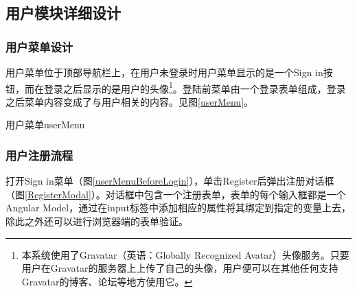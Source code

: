 \subsection{用户模块详细设计}
\subsubsection{用户菜单设计}
用户菜单位于顶部导航栏上，在用户未登录时用户菜单显示的是一个Sign in按钮，而在登录之后显示的是用户的头像\footnote{本系统使用了Gravatar（英语：Globally Recognized Avatar）头像服务。只要用户在Gravatar的服务器上上传了自己的头像，用户便可以在其他任何支持Gravatar的博客、论坛等地方使用它。}。登陆前菜单由一个登录表单组成，登录之后菜单内容变成了与用户相关的内容。见图\ref{userMenu}。

\begin{pics}[htbp]{用户菜单}{userMenu}
\end{pics}



%



\subsubsection{用户注册流程}
打开Sign in菜单（图\ref{userMenuBeforeLogin}），单击Register后弹出注册对话框（图\ref{RegisterModal}）。对话框中包含一个注册表单，表单的每个输入框都是一个Angular Model，通过在input标签中添加相应的属性将其绑定到指定的变量上去，除此之外还可以进行浏览器端的表单验证。

